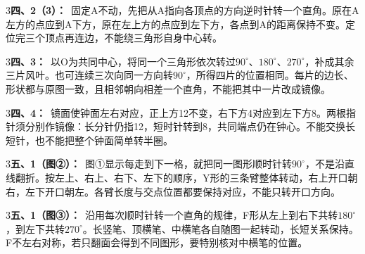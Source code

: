 \documentclass[multi=snippet,border={5bp 20bp 5bp 5bp}]{standalone}
\newenvironment{snippet}[3]{\begin{minipage}{#1bp}\color{answerred}\fontsize{#2}{#3}\selectfont\raggedright}{\end{minipage}}
\begin{document}
\begin{snippet}{505}{11.5}{14}\begin{multicols}{3}\raggedcolumns \textbf{四、2（3）：}\ 固定A不动，先把从A指向各顶点的方向逆时针转一个直角。原在A左方的点应到A下方，原在左上方的点应到左下方，各点到A的距离保持不变。定位完三个顶点再连边，不能绕三角形自身中心转。\end{multicols}\end{snippet}
\begin{snippet}{505}{11.5}{14}\begin{multicols}{3}\raggedcolumns \textbf{四、3：}\ 以O为共同中心，将同一个三角形依次转过\(90^\circ\)\allowbreak 、\(180^\circ\)\allowbreak 、\(270^\circ\)\allowbreak ，补成其余三片风叶。也可连续三次向同一方向转\(90^\circ\)\allowbreak ，所得四片的位置相同。每片的边长、形状都与原图一致，且相邻朝向相差一个直角，不能把其中一片改成镜像。\end{multicols}\end{snippet}
\begin{snippet}{505}{11.5}{14}\begin{multicols}{3}\raggedcolumns \textbf{四、4：}\ 镜面使钟面左右对应，正上方12不变，右下方4对应到左下方8。两根指针须分别作镜像：长分针仍指12，短时针转到8，共同端点仍在钟心。不能交换长短针，也不能把整个钟面简单转半圈。\end{multicols}\end{snippet}
\begin{snippet}{505}{11.5}{14}\begin{multicols}{3}\raggedcolumns \textbf{五、1（图②）：}\ 图①显示每走到下一格，就把同一图形顺时针转\(90^\circ\)\allowbreak ，不是沿直线翻折。按左上、右上、右下、左下的顺序，Y形的三条臂整体转动，右上开口朝右，左下开口朝左。各臂长度与交点位置都要保持对应，不能只转开口方向。\end{multicols}\end{snippet}
\begin{snippet}{505}{11.5}{14}\begin{multicols}{3}\raggedcolumns \textbf{五、1（图③）：}\ 沿用每次顺时针转一个直角的规律，F形从左上到右下共转\(180^\circ\)\allowbreak ，到左下共转\(270^\circ\)\allowbreak 。长竖笔、顶横笔、中横笔各自随图一起转动，长短关系保持。F不左右对称，若只翻面会得到不同图形，要特别核对中横笔的位置。\end{multicols}\end{snippet}
\end{document}
